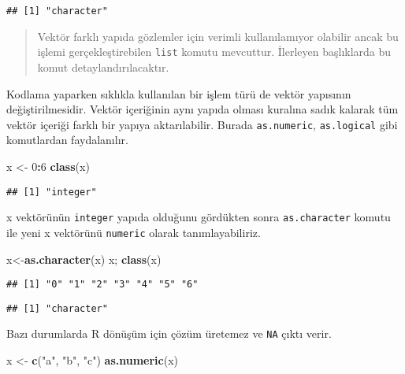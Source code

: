 \documentclass[
]{book}
\newenvironment{Shaded}{\begin{snugshade}}{\end{snugshade}}
\newcommand{\DecValTok}[1]{\textcolor[rgb]{0.00,0.00,0.81}{#1}}
\newcommand{\KeywordTok}[1]{\textcolor[rgb]{0.13,0.29,0.53}{\textbf{#1}}}
\newcommand{\NormalTok}[1]{#1}
\newcommand{\OperatorTok}[1]{\textcolor[rgb]{0.81,0.36,0.00}{\textbf{#1}}}
\newcommand{\StringTok}[1]{\textcolor[rgb]{0.31,0.60,0.02}{#1}}
\begin{document}
\begin{verbatim}
## [1] "character"
\end{verbatim}

\begin{quote}
Vektör farklı yapıda gözlemler için verimli kullanılamıyor olabilir ancak bu işlemi gerçekleştirebilen \texttt{list} komutu mevcuttur. İlerleyen başlıklarda bu komut detaylandırılacaktır.
\end{quote}

Kodlama yaparken sıklıkla kullanılan bir işlem türü de vektör yapısının değiştirilmesidir. Vektör içeriğinin aynı yapıda olması kuralına sadık kalarak tüm vektör içeriği farklı bir yapıya aktarılabilir. Burada \texttt{as.numeric}, \texttt{as.logical} gibi komutlardan faydalanılır.

\begin{Shaded}
\begin{Highlighting}[]
\NormalTok{x <-}\StringTok{ }\DecValTok{0}\OperatorTok{:}\DecValTok{6}
\KeywordTok{class}\NormalTok{(x)}
\end{Highlighting}
\end{Shaded}

\begin{verbatim}
## [1] "integer"
\end{verbatim}

x vektörünün \texttt{integer} yapıda olduğunu gördükten sonra \texttt{as.character} komutu ile yeni x vektörünü \texttt{numeric} olarak tanımlayabiliriz.

\begin{Shaded}
\begin{Highlighting}[]
\NormalTok{x<-}\KeywordTok{as.character}\NormalTok{(x)}
\NormalTok{x; }\KeywordTok{class}\NormalTok{(x)}
\end{Highlighting}
\end{Shaded}

\begin{verbatim}
## [1] "0" "1" "2" "3" "4" "5" "6"
\end{verbatim}

\begin{verbatim}
## [1] "character"
\end{verbatim}

Bazı durumlarda R dönüşüm için çözüm üretemez ve \texttt{NA} çıktı verir.

\begin{Shaded}
\begin{Highlighting}[]
\NormalTok{x <-}\StringTok{ }\KeywordTok{c}\NormalTok{(}\StringTok{"a"}\NormalTok{, }\StringTok{"b"}\NormalTok{, }\StringTok{"c"}\NormalTok{)}
\KeywordTok{as.numeric}\NormalTok{(x)}
\end{Highlighting}
\end{Shaded}
\end{document}
